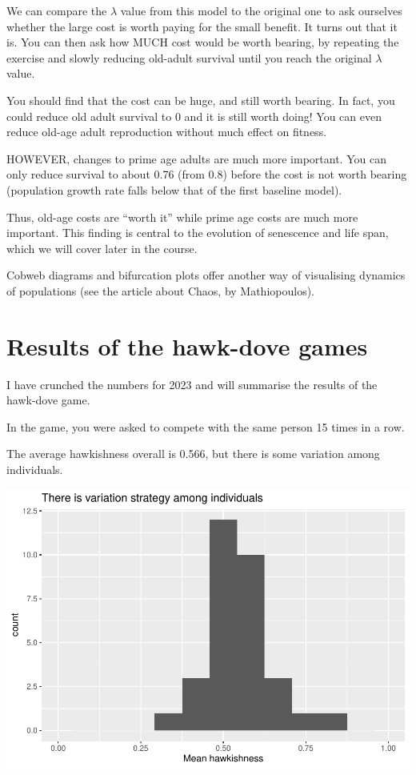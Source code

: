 \documentclass[
  a4paper]{book}
\begin{document}
We can compare the \(\lambda\) value from this model to the original one to ask ourselves whether the large cost is worth paying for the small benefit. It turns out that it is. You can then ask how MUCH cost would be worth bearing, by repeating the exercise and slowly reducing old-adult survival until you reach the original \(\lambda\) value.

You should find that the cost can be huge, and still worth bearing. In fact, you could reduce old adult survival to 0 and it is still worth doing! You can even reduce old-age adult reproduction without much effect on fitness.

HOWEVER, changes to prime age adults are much more important. You can only reduce survival to about 0.76 (from 0.8) before the cost is not worth bearing (population growth rate falls below that of the first baseline model).

Thus, old-age costs are ``worth it'' while prime age costs are much more important. This finding is central to the evolution of senescence and life span, which we will cover later in the course.

Cobweb diagrams and bifurcation plots offer another way of visualising dynamics of populations (see the article about Chaos, by Mathiopoulos).

\section{Results of the hawk-dove games}\label{results-of-the-hawk-dove-games}

I have crunched the numbers for 2023 and will summarise the results of the hawk-dove game.

In the game, you were asked to compete with the same person 15 times in a row.

The average hawkishness overall is 0.566, but there is some variation among individuals.

\includegraphics{BB512_files/figure-latex/hawkdoveresults3-1.pdf}
\end{document}
